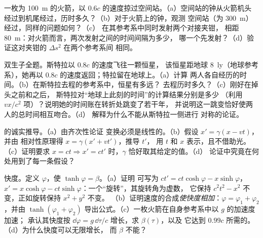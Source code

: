 \begin{exercise}[$\star\star$]\label{exo:b3:relativistic-kinematics:9}
一枚为 \qty{100}{m} 的火箭，以
$0.6c$ 的速度掠过空间站。（a）空间站的钟从火箭机头
经过到机尾经过，历时多久？（b）对于火箭上的钟，观测
空间站（为 \qty{300}{m}）经过，同样的问题如何？（c）
在其参考系中同时发射两个对接夹钳，
相距 \qty{80}{m}：对火箭而言，两次发射之间的时间间隔为多少，
哪一个先发射？（d）验证这对夹钳的 $\Delta s^2$ 在两个参考系间
相同。
\end{exercise}

\begin{exercise}[$\star\star\star$]\label{exo:b3:relativistic-kinematics:10}
双生子全题。斯特拉以 $0.8c$ 的速度飞往一颗恒星，
该恒星距地球 \qty{8}{ly}（地球参考系），她再以 $0.8c$ 的速度返回；特拉留在地球上。（a）计算
两人各自经历的时间。（b）在斯特拉去程的参考系中，恒星有多远？
去程历时多久？（c）刚好在掉头之前和之后，
斯特拉对“地球上此刻的时间”的计算结果分别是多少
（利用 $vx/c^2$ 项）？说明她的时间账在转折处跳变了若干年，
并说明这一跳变恰好使两人的总时间相互吻合。（d）
解释为什么不能从斯特拉一侧进行
对称的论证。
\end{exercise}

\begin{exercise}[$\star\star\star$]\label{exo:b3:relativistic-kinematics:11}
的诚实推导。（a）由齐次性论证
变换必须是线性的。（b）假设 $x' = \gamma(x - vt)$，并由
相对性原理得 $x = \gamma(x' + vt')$，推导 $t'$，
用 $t$ 和 $x$ 表示，且不借助光。（c）证明要求
$x = ct \Rightarrow x' = ct'$ 时，$\gamma$ 恰好取其给定的值。（d）
论证中究竟在何处用到了每一条假设？
\end{exercise}

\begin{exercise}[$\star\star\star$]\label{exo:b3:relativistic-kinematics:12}
快度。定义 $\varphi$，使 $\tanh\varphi = \beta$。（a）证明
可写为 $ct' = ct\cosh\varphi - x\sinh\varphi$，
$x' = x\cosh\varphi - ct\sinh\varphi$：一个“旋转”，其旋转角为虚数，
它保持 $c^2t^2 - x^2$ 不变，正如旋转保持 $x^2 + y^2$ 不变。
（b）证明速度的合成\emph{使快度相加}：$\varphi =
\varphi_1 + \varphi_2$，并由
$\tanh(\varphi_1 + \varphi_2)$ 导出公式。（c）一枚火箭在自身参考系中以 $g$ 的加速度加速；
承认其快度按 $\dd\varphi = g\,
\dd\tau/c$ 增长，求 $\beta(\tau)$，以及
它达到 $0.99c$ 所需的。（d）为什么快度可以无限增长，
而 $\beta$ 不能？
\end{exercise}

